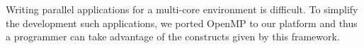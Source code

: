 Writing parallel applications for a multi-core environment is difficult. To
simplify the development such applications, we ported OpenMP to our platform and
thus a programmer can take advantage of the constructs given by this framework.

%

